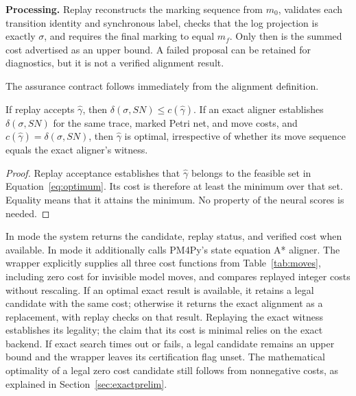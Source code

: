 \textbf{Processing.} Replay reconstructs the marking sequence from $m_0$, validates each transition identity and synchronous label, checks that the log projection is exactly $\sigma$, and requires the final marking to equal $m_f$. Only then is the summed cost advertised as an upper bound. A failed proposal can be retained for diagnostics, but it is not a verified alignment result.

The assurance contract follows immediately from the alignment definition.
\begin{Proposition}
If replay accepts $\widehat\gamma$, then $\delta(\sigma,SN)\leq c(\widehat\gamma)$. If an exact aligner establishes $\delta(\sigma,SN)$ for the same trace, marked Petri net, and move costs, and $c(\widehat\gamma)=\delta(\sigma,SN)$, then $\widehat\gamma$ is optimal, irrespective of whether its move sequence equals the exact aligner's witness.
\end{Proposition}
\begin{proof}
Replay acceptance establishes that $\widehat\gamma$ belongs to the feasible set in Equation~\eqref{eq:optimum}. Its cost is therefore at least the minimum over that set. Equality means that it attains the minimum. No property of the neural scores is needed.
\end{proof}

In \Fast{} mode the system returns the candidate, replay status, and verified cost when available. In \Certified{} mode it additionally calls PM4Py's state equation A* aligner. The wrapper explicitly supplies all three cost functions from Table~\ref{tab:moves}, including zero cost for invisible model moves, and compares replayed integer costs without rescaling. If an optimal exact result is available, it retains a legal candidate with the same cost; otherwise it returns the exact alignment as a replacement, with replay checks on that result. Replaying the exact witness establishes its legality; the claim that its cost is minimal relies on the exact backend. If exact search times out or fails, a legal candidate remains an upper bound and the wrapper leaves its certification flag unset. The mathematical optimality of a legal zero cost candidate still follows from nonnegative costs, as explained in Section~\ref{sec:exactprelim}.

